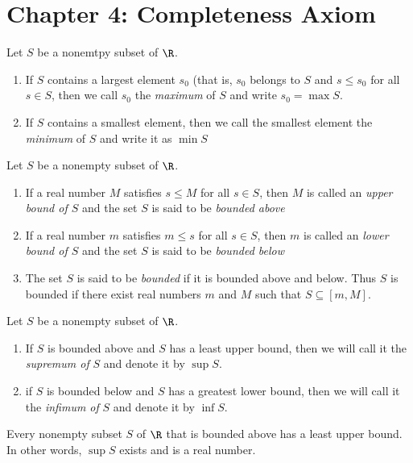 \documentclass[twoside, 10pt]{article}
\begin{document}
\section*{Chapter 4: Completeness Axiom}
\begin{defn}
Let $S$ be a nonemtpy subset of $\R$.
\begin{enumerate}
    \item If $S$ contains a largest element $s_0$ (that is, $s_0$ belongs to $S$ and $s\le s_0$ for all $s\in S$, then we call $s_0$ the \emph{maximum} of $S$ and write $s_0=\max S$.
    \item If $S$ contains a smallest element, then we call the smallest element the \emph{minimum} of $S$ and write it as $\min S$
\end{enumerate}
\end{defn}

\begin{defn}[Bounds]
Let $S$ be a nonempty subset of $\R$.
\begin{enumerate}
    \item If a real number $M$ satisfies $s\le M$ for all $s\in S$, then $M$ is called an \emph{upper bound of $S$} and the set $S$ is said to be \emph{bounded above}
    \item If a real number $m$ satisfies $m\le s$ for all $s\in S$, then $m$ is called an \emph{lower bound of $S$} and the set $S$ is said to be \emph{bounded below}
    \item The set $S$ is said to be \emph{bounded} if it is bounded above and below. Thus $S$ is bounded if there exist real numbers $m$ and $M$ such that $S\subseteq [m, M]$.
\end{enumerate}
\end{defn}

\begin{defn}
Let $S$ be a nonempty subset of $\R$.
\begin{enumerate}
    \item If $S$ is bounded above and $S$ has a least upper bound, then we will call it the \emph{supremum of} $S$ and denote it by $\sup S$.
    \item if $S$ is bounded below and $S$ has a greatest lower bound, then we will call it the \emph{infimum of} $S$ and denote it by $\inf S$.
\end{enumerate}
\end{defn}

\begin{thm} 
Every nonempty subset $S$ of $\R$ that is bounded above has a least upper bound. In other words, $\sup S$ exists and is a real number.
\end{thm}
\end{document}
